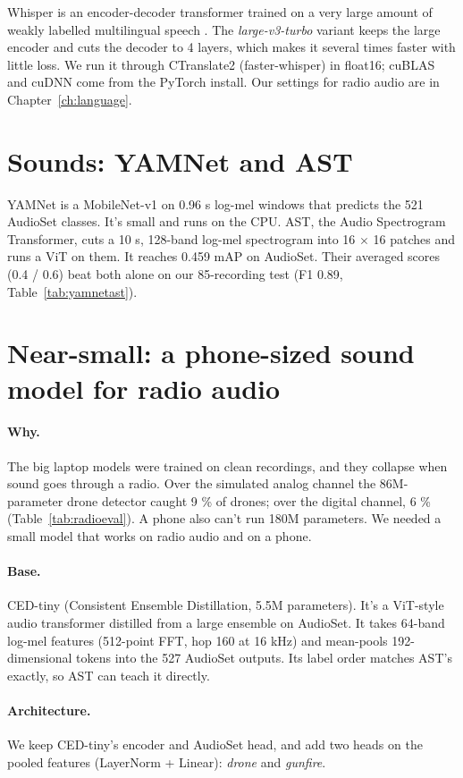 Whisper is an encoder-decoder transformer trained on a very large amount of weakly labelled multilingual speech \cite{whisper}. The \emph{large-v3-turbo}
variant keeps the large encoder and cuts the decoder to 4 layers, which makes it several times faster with little
loss. We run it through CTranslate2 (faster-whisper) in float16; cuBLAS and cuDNN come from the PyTorch install.
Our settings for radio audio are in Chapter~\ref{ch:language}.

\section{Sounds: YAMNet and AST}

YAMNet is a MobileNet-v1 on 0.96 s log-mel windows that predicts the 521 AudioSet classes. It's small and runs on the
CPU. AST, the Audio Spectrogram Transformer, cuts a 10 s, 128-band log-mel spectrogram into 16 $\times$ 16 patches
and runs a ViT on them. It reaches 0.459 mAP on AudioSet. Their averaged scores (0.4 / 0.6) beat both alone on our
85-recording test (F1 0.89, Table~\ref{tab:yamnetast}).

\section{Near-small: a phone-sized sound model for radio audio}

\paragraph{Why.} The big laptop models were trained on clean recordings, and they collapse when sound goes through a
radio. Over the simulated analog channel the 86M-parameter drone detector caught 9 \% of drones; over the digital
channel, 6 \% (Table~\ref{tab:radioeval}). A phone also can't run 180M parameters. We needed a small model that works
on radio audio and on a phone.

\paragraph{Base.} CED-tiny (Consistent Ensemble Distillation, 5.5M parameters). It's a ViT-style audio transformer
distilled from a large ensemble on AudioSet. It takes 64-band log-mel features (512-point FFT, hop 160 at 16 kHz) and
mean-pools 192-dimensional tokens into the 527 AudioSet outputs. Its label order matches AST's exactly, so AST can teach it
directly.

\paragraph{Architecture.} We keep CED-tiny's encoder and AudioSet head, and add two heads on the pooled features
(LayerNorm + Linear): \emph{drone} and \emph{gunfire}.

